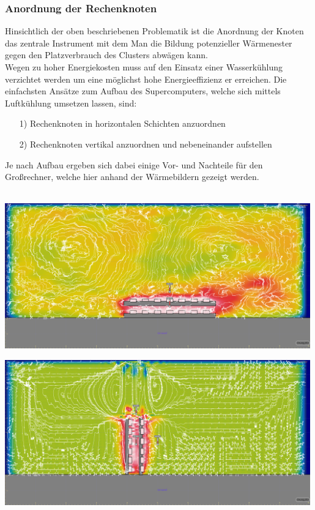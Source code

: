 \subsubsection{Anordnung der Rechenknoten}
Hinsichtlich der oben beschriebenen Problematik ist die Anordnung der Knoten 
das zentrale Instrument mit dem Man die Bildung potenzieller Wärmenester 
gegen den Platzverbrauch des Clusters abwägen kann.~\\
Wegen zu hoher Energiekosten muss auf den Einsatz einer
Wasserkühlung verzichtet werden um eine möglichst hohe Energieeffizienz 
er erreichen.
Die einfachsten Ansätze zum Aufbau des Supercomputers, 
welche sich mittels Luftkühlung umsetzen lassen, sind:
\begin{itemize}
\item[1)]Rechenknoten in horizontalen Schichten anzuordnen
\item[2)]Rechenknoten vertikal anzuordnen und nebeneinander aufstellen
\end{itemize} 
Je nach Aufbau ergeben sich dabei einige Vor- und Nachteile für den Großrechner, welche hier anhand der
Wärmebildern gezeigt werden.\\
~\\
\begin{minipage}{0.50\textwidth}
\centering
	\includegraphics[width=0.99\textwidth]{./Bilder/Server-Aufbau/convective-horizontal-2.png}
	\label{fig:sample_figure}
\end{minipage}
\hfill
\begin{minipage}{0.50\textwidth}
\centering
	\includegraphics[width=0.99\textwidth]{./Bilder/Server-Aufbau/convective-vertical-2.png}
	\label{fig:sample_figure}
\end{minipage}
